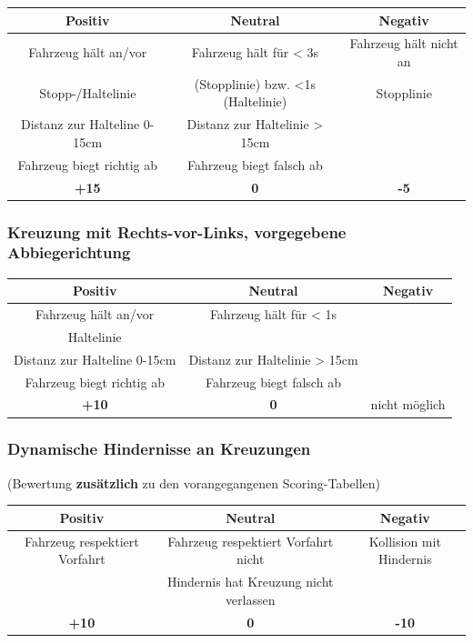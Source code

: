 \documentclass[a4paper, 11pt,usegeometry]{scrartcl}
\begin{document}
\begin{table}[H]
\begin{tabular}{|c|c|c|}
\hline
\rowcolor[HTML]{CACACA} 
\textbf{Positiv} & \textbf{Neutral} & \textbf{Negativ} \\ \hline
Fahrzeug hält an/vor & Fahrzeug hält für < 3s & Fahrzeug hält nicht an \\
Stopp-/Haltelinie & (Stopplinie) bzw. <1s (Haltelinie) & Stopplinie \\ \hline
Distanz zur Halteline 0-15cm & Distanz zur Haltelinie > 15cm & \\ \hline
Fahrzeug biegt richtig ab & Fahrzeug biegt falsch ab & \\ \hline
\textbf{+15} & \textbf{0} & \textbf{-5} \\ \hline
\end{tabular}
\end{table}

\subsubsection*{Kreuzung mit Rechts-vor-Links, vorgegebene Abbiegerichtung}

\begin{table}[H]
\begin{tabular}{|c|c|c|}
\hline
\rowcolor[HTML]{CACACA} 
\textbf{Positiv} & \textbf{Neutral} & \textbf{Negativ} \\ \hline
Fahrzeug hält an/vor & Fahrzeug hält für < 1s &  \\
Haltelinie &  &  \\ \hline
Distanz zur Halteline 0-15cm & Distanz zur Haltelinie > 15cm & \\ \hline
Fahrzeug biegt richtig ab & Fahrzeug biegt falsch ab & \\ \hline
\textbf{+10} & \textbf{0} & nicht möglich \\ \hline
\end{tabular}
\end{table}

\subsubsection*{Dynamische Hindernisse an Kreuzungen}
(Bewertung \textbf{zusätzlich} zu den vorangegangenen Scoring-Tabellen)

\begin{table}[H]
\begin{tabular}{|c|c|c|}
\hline
\rowcolor[HTML]{CACACA} 
\textbf{Positiv} & \textbf{Neutral} & \textbf{Negativ} \\ \hline
Fahrzeug respektiert Vorfahrt & Fahrzeug respektiert Vorfahrt nicht & Kollision mit Hindernis \\ \hline
& Hindernis hat Kreuzung nicht verlassen & \\ \hline
\textbf{+10} & \textbf{0} & \textbf{-10} \\ \hline
\end{tabular}
\end{table}
\end{document}
